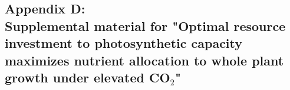 \begin{singlespace}
    \chapter{\textbf{Appendix D: \\ Supplemental material for "Optimal resource investment to photosynthetic capacity maximizes nutrient allocation to whole plant growth under elevated CO$_2$"}}
\end{singlespace}

\setcounter{table}{0}
\renewcommand{\thetable}{D\arabic{table}}

